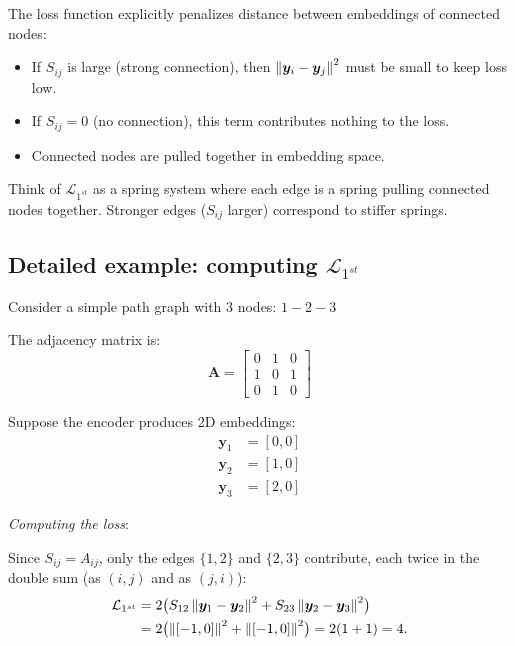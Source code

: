 \begin{notechapter}
The loss function explicitly penalizes distance between embeddings of connected nodes:

\begin{itemize}
    \item If $S_{ij}$ is large (strong connection), then $\left\|\bm{y}_i - \bm{y}_j\right\|^2$ must be small to keep loss low.
    \item If $S_{ij} = 0$ (no connection), this term contributes nothing to the loss.
    \item Connected nodes are pulled together in embedding space.
\end{itemize}

\begin{intuition}
Think of $\mathcal{L}_{1^{st}}$ as a spring system where each edge is a spring pulling connected nodes together. Stronger edges ($S_{ij}$ larger) correspond to stiffer springs.
\end{intuition}

\subsection{Detailed example: computing $\mathcal{L}_{1^{st}}$}

\begin{example}
Consider a simple path graph with 3 nodes: $1 - 2 - 3$

The adjacency matrix is:
\[
\bm{A} = \begin{bmatrix}
0 & 1 & 0 \\
1 & 0 & 1 \\
0 & 1 & 0
\end{bmatrix}
\]

Suppose the encoder produces 2D embeddings:
\begin{align*}
\bm{y}_1 &= [0, 0] \\
\bm{y}_2 &= [1, 0] \\
\bm{y}_3 &= [2, 0]
\end{align*}

\emph{Computing the loss}:

Since $S_{ij} = A_{ij}$, only the edges $\{1,2\}$ and $\{2,3\}$ contribute, each twice in the double sum (as $(i,j)$ and as $(j,i)$):
\begin{align*}
\mathcal{L}_{1^{st}} &= 2\bigl(S_{12} \left\|\bm{y}_1 - \bm{y}_2\right\|^2 + S_{23} \left\|\bm{y}_2 - \bm{y}_3\right\|^2\bigr) \\
&= 2\bigl(\left\|[-1,0]\right\|^2 + \left\|[-1,0]\right\|^2\bigr) = 2(1 + 1) = 4 .
\end{align*}


\end{example}
\end{notechapter}
